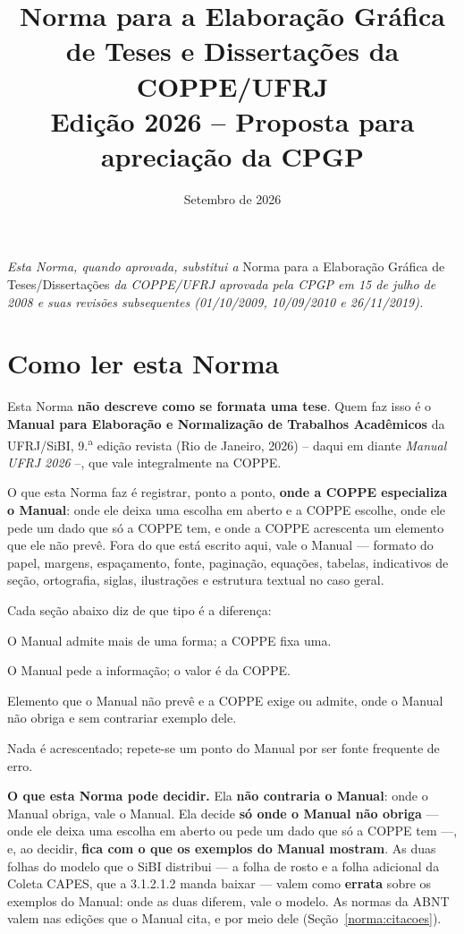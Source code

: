 \documentclass[a4paper,11pt]{article}
\title{\bfseries Norma para a Elaboração Gráfica de Teses e
       Dissertações da COPPE/UFRJ\\[2mm]
       \large Edição 2026 -- Proposta para apreciação da CPGP}
\author{}
\date{Setembro de 2026}
\begin{document}
\maketitle

\noindent\textit{Esta Norma, quando aprovada, substitui a} Norma para a
Elaboração Gráfica de Teses/Dissertações \textit{da COPPE/UFRJ aprovada pela
CPGP em 15 de julho de 2008 e suas revisões subsequentes (01/10/2009,
10/09/2010 e 26/11/2019).}

\hrulefill

\section*{Como ler esta Norma}

Esta Norma \textbf{não descreve como se formata uma tese}. Quem faz isso é o
\textbf{Manual para Elaboração e Normalização de Trabalhos Acadêmicos} da
UFRJ/SiBI, 9.\textsuperscript{a} edição revista (Rio de Janeiro, 2026) -- daqui
em diante \textit{Manual UFRJ 2026} --, que vale integralmente na COPPE.

O que esta Norma faz é registrar, ponto a ponto, \textbf{onde a COPPE
especializa o Manual}: onde ele deixa uma escolha em aberto e a COPPE escolhe,
onde ele pede um dado que só a COPPE tem, e onde a COPPE acrescenta um elemento
que ele não prevê. Fora do que está escrito aqui, vale o Manual --- formato do
papel, margens, espaçamento, fonte, paginação, equações, tabelas, indicativos de
seção, ortografia, siglas, ilustrações e estrutura textual no caso geral.

Cada seção abaixo diz de que tipo é a diferença:

\begin{description}[leftmargin=2.6cm,style=nextline,font=\bfseries]
  \item[Escolha] O Manual admite mais de uma forma; a COPPE fixa uma.
  \item[Dado próprio] O Manual pede a informação; o valor é da COPPE.
  \item[Acréscimo] Elemento que o Manual não prevê e a COPPE exige ou admite,
    onde o Manual não obriga e sem contrariar exemplo dele.
  \item[Reafirmação] Nada é acrescentado; repete-se um ponto do Manual por ser
    fonte frequente de erro.
\end{description}

\textbf{O que esta Norma pode decidir.} Ela \textbf{não contraria o Manual}:
onde o Manual obriga, vale o Manual. Ela decide \textbf{só onde o Manual não
obriga} --- onde ele deixa uma escolha em aberto ou pede um dado que só a COPPE
tem ---, e, ao decidir, \textbf{fica com o que os exemplos do Manual mostram}. As
duas folhas do modelo que o SiBI distribui --- a folha de rosto e a folha
adicional da Coleta CAPES, que a 3.1.2.1.2 manda baixar --- valem como
\textbf{errata} sobre os exemplos do Manual: onde as duas diferem, vale o
modelo. As normas da ABNT valem nas edições que o Manual cita, e por meio dele
(Seção~\ref{norma:citacoes}).
\end{document}
